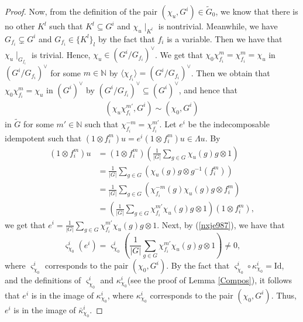\documentclass[11pt,reqno]{amsart}
\theoremstyle{definition}
\begin{document}
\begin{proof}
Now, from the definition of the
pair $(\chi_u, G^i) \in \tilde{G}_0$, we know
that there is no other $K^l$ such that
$K^l \subseteq G^i$ and $\chi_u \mid_{K^l}$ 
is nontrivial.
Meanwhile, we have $G_{f_i} \subsetneq G^i$ and $G_{f_i} \in \{K^l\}_l$ by the fact that $f_i$ is a variable.
Then we have that $\chi_u \mid_{G_{f_i}}$ is trivial. 
Hence, $\chi_u \in (G^i/G_{f_i})^{\vee}$.
We get that $\chi_{0} \chi_{f_i}^{m} = \chi_{f_i}^{m} 
= \chi_u$ in $(G^i/G_{f_i})^{\vee}$ for some $m \in \mathbb{N}$ by $\langle\chi_{f_i}\rangle 
=  (G^i / G_{f_i})^{\vee}$. 
Then we obtain that
$\chi_{0} \chi_{f_i}^{m} = \chi_u$ in $(G^i)^\vee$ by $(G^i/G_{f_i})^{\vee} \subseteq (G^i)^\vee$, and hence
that 
\begin{align}\label{nxje987}
(\chi_u \chi_{f_i}^{m'}, G^i) \sim (\chi_0, G^i)
\end{align}
in $\tilde{G}$ 
for some $m' \in \mathbb{N}$ such that $\chi_{f_i}^{-m} = \chi_{f_i}^{m'}$.
Let $e^i$ be the indecomposable idempotent such that
$ (1 \otimes f_i^{m}) u = e^i (1 \otimes f_i^{m})u \in \Lambda u$. 
By 
\begin{align}\label{jvxw56} 
(1 \otimes f_i^{m})u &= (1 \otimes f_i^{m}) 
(\frac{1}{|G|} \sum\limits_{g \in G} \chi_u(g) g \otimes 1)	 \nonumber \\
&= \frac{1}{|G|} \sum\limits_{g \in G} 
( \chi_u(g) g  \otimes g^{-1}(f_i^{m})) \nonumber \\
& =\displaystyle
\frac{1}{|G|} \sum\limits_{g \in G} 
( \chi_{f_i}^{-m}(g) \chi_u(g) g  \otimes f_i^{m}) \nonumber \\ 
& =(\frac{1}{|G|} \sum\limits_{g \in G} 
\chi^{m'}_{f_i}\chi_u(g)g  \otimes 1 )  (1 \otimes f_i^{m}),
\end{align}
we get that $e^i = \displaystyle
\frac{1}{|G|} 
\sum\limits_{g \in G} 
\chi^{m'}_{f_i}\chi_u(g)g  \otimes 1$. 
Next, by 
(\ref{nxje987}), 
we have that 
$$
\varsigma^{i}_{\chi_0}(e^i)  = \varsigma^{i}_{\chi_0} ( \frac{1}{|G|} 
\sum\limits_{g \in G} \chi^{m'}_{f_i}\chi_u(g)g  \otimes 1 ) \neq 0,
$$ 
where $\varsigma^i_{\chi_0}$ corresponds 
to the pair $(\chi_0, G^i)$. 
By the fact that $\varsigma^{i}_{\chi_0}
\circ \kappa^{i}_{\chi_0} = \mathrm{Id}$, and the definitions of 
$\varsigma^{i}_{\chi_0}$ and $\kappa^{i}_{\chi_0}$(see the proof of Lemma \ref{Compos}), 
it follows that $e^i$ is in the image of $\kappa^i_{\chi_0}$, where 
$\kappa^i_{\chi_0}$ corresponds to the pair $(\chi_0, G^i)$.  
Thus, $e^i$ is in the image of $\bar\kappa^i_{\chi_0}$.


\end{proof}
\end{document}
